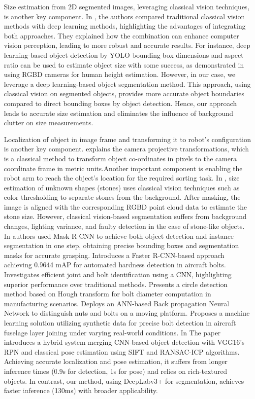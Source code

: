 \documentclass[letterpaper, 10 pt, conference]{ieeeconf}  %
\begin{document}
Size estimation from 2D segmented images, leveraging classical vision techniques, is another key component. In \cite{DeepLearningvsClassicalVision}, the authors compared traditional classical vision methods with deep learning methods, highlighting the advantages of integrating both approaches. They explained how the combination can enhance computer vision perception, leading to more robust and accurate results. For instance, deep learning-based object detection by YOLO bounding box dimensions and aspect ratio can be used to estimate object size with some success, as demonstrated in \cite{RGBD} using RGBD cameras for human height estimation. However, in our case, we leverage a deep learning-based object segmentation method. This approach, using classical vision on segmented objects, provides more accurate object boundaries compared to direct bounding boxes by object detection. Hence, our approach leads to accurate size estimation and eliminates the influence of background clutter on size measurements.

Localization of object in image frame and transforming it to robot's configuration is another key component. \cite{projective} explains the camera projective transformations, which is a classical method to transform object co-ordinates in pixels to the camera coordinate frame in metric units.Another important component is enabling the robot arm to reach the object's location for the required sorting task. In \cite{stonesize}, size estimation of unknown shapes (stones) uses classical vision techniques such as color thresholding to separate stones from the background. After masking, the image is aligned with the corresponding RGBD point cloud data to estimate the stone size. However, classical vision-based segmentation suffers from background changes, lighting variance, and faulty detection in the case of stone-like objects. In \cite{F-RCNN} authors used Mask R-CNN to achieve both object detection and instance segmentation in one step, obtaining precise bounding boxes and segmentation masks for accurate grasping. \cite{FRCNN} Introduces a Faster R-CNN-based approach achieving 0.9644 mAP for automated hardness detection in aircraft bolts. \cite{CNN} Investigates efficient joint and bolt identification using a CNN, highlighting superior performance over traditional methods. \cite{Hough} Presents a circle detection method based on Hough transform for bolt diameter computation in manufacturing scenarios. \cite{NUTBOLT} Deploys an ANN-based Back propagation Neural Network to distinguish nuts and bolts on a moving platform. \cite{DomainRandomization} Proposes a machine learning solution utilizing synthetic data for precise bolt detection in aircraft fuselage layer joining under varying real-world conditions. In \cite{editor} The paper introduces a hybrid system merging CNN-based object detection with VGG16's RPN and classical pose estimation using SIFT and RANSAC-ICP algorithms. Achieving accurate localization and pose estimation, it suffers from longer inference times (0.9s for detection, 1s for pose) and relies on rich-textured objects. In contrast, our method, using DeepLabv3+ for segmentation, achieves faster inference (130ms) with broader applicability.
\end{document}
